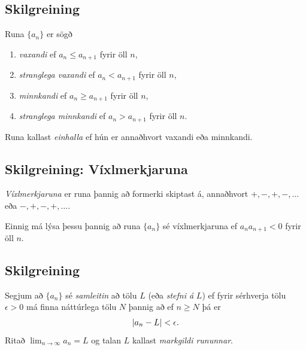\documentclass[b5paper,10pt,icelandic]{sphinxmanual}
\begin{document}
\subsection{Skilgreining}
\label{kafli09:id1}\label{kafli09:index-2}
Runa \(\{a_n\}\) er sögð
\begin{enumerate}
\item {} 
\emph{vaxandi} ef \(a_n\leq a_{n+1}\) fyrir öll \(n\),

\item {} 
\emph{stranglega vaxandi} ef \(a_n< a_{n+1}\) fyrir öll \(n\),

\item {} 
\emph{minnkandi} ef \(a_n\geq a_{n+1}\) fyrir öll \(n\),

\item {} 
\emph{stranglega minnkandi} ef \(a_n> a_{n+1}\) fyrir öll
\(n\).

\end{enumerate}

Runa kallast \emph{einhalla} ef hún er annaðhvort vaxandi eða minnkandi.


\subsection{Skilgreining: Víxlmerkjaruna}
\label{kafli09:skilgreining-vixlmerkjaruna}\label{kafli09:index-3}
\emph{Víxlmerkjaruna} er runa þannig að formerki skiptast á, annaðhvort
\(+, -, +, -, \ldots\) eða \(-, +, -, +, \ldots\).

Einnig má lýsa þessu þannig að runa \(\{a_n\}\) sé víxlmerkjaruna ef
\(a_na_{n+1}<0\) fyrir öll \(n\).


\subsection{Skilgreining}
\label{kafli09:id2}\label{kafli09:index-4}
Segjum að \(\{a_n\}\) sé \emph{samleitin} að tölu \(L\) (eða \emph{stefni
á} \(L\)) ef fyrir sérhverja tölu \(\epsilon>0\) má finna
náttúrlega tölu \(N\) þannig að ef \(n\geq N\) þá er
\begin{gather}
\begin{split}|a_n-L|<\epsilon.\end{split}\notag
\end{gather}
Ritað \(\lim_{n\rightarrow \infty}a_n=L\) og talan \(L\) kallast
\emph{markgildi rununnar}.
\end{document}
